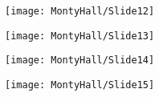 \documentclass{beamer}
\begin{document}
\begin{frame}
	\begin{figure}
		\centering
		\texttt{[image: MontyHall/Slide12]}

	\end{figure}
	
\end{frame}

\begin{frame}
	\begin{figure}
		\centering
		\texttt{[image: MontyHall/Slide13]}
	\end{figure}
	
\end{frame}
\begin{frame}
	\begin{figure}
		\centering
		\texttt{[image: MontyHall/Slide14]}

	\end{figure}
	
\end{frame}

\begin{frame}
	\begin{figure}
		\centering
		\texttt{[image: MontyHall/Slide15]}
		
	\end{figure}
	
\end{frame}
\end{document}

